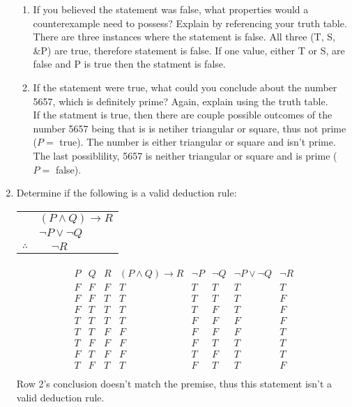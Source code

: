 \documentclass[11pt,a4paper]{article}
\newcommand\setItemNumber[1]{\setcounter{enumi}{\numexpr#1-1\relax}}
\begin{document}
\begin{enumerate}
\begin{enumerate}
                \item If you believed the statement was false, what properties would a counterexample need to possess? Explain by referencing your truth table.\\
                    There are three instances where the statement is false. All three (T, S, \&P) are true, therefore statement is false.  If one value, either T or S, are false and P is true then the statment is false. 
                \item If the statement were true, what could you conclude about the number 5657, which is definitely prime? Again, explain using the truth table.\\
                    If the statment is true, then there are couple possible outcomes of the number 5657 being that is is netiher triangular or square, thus not prime ($P =$ true). The number is either triangular or square and isn't prime. The last possiblility, 5657 is neither triangular or square and is prime ($P =$ false).
            \end{enumerate}

        \setItemNumber{14}
        \item Determine if the following is a valid deduction rule:
        \begin{center}
        \begin{tabular}{c@{\,}l@{}} 
                                & $(P\land Q)\rightarrow R$\\
                                & \;\;$\neg P\lor\neg Q$ \\\cline{1-2}
            $\therefore$        & $\;\;\;\;\neg R$ \\
          \end{tabular}
        \end{center}

                \begin{align*}
                    \begin{array}{|c|c|c|c|c|c|c|c|}
                        P & Q & R & (P\land Q)\rightarrow R & \neg P & \neg Q & \neg P \lor \neg Q & \neg R\\
                    \hline
                        F & F & F & T & T & T & T & T\\
                        F & F & T & T & T & T & T & F\\
                        F & T & T & T & T & F & T & F\\
                        T & T & T & T & F & F & F & F\\
                        T & T & F & F & F & F & F & T\\
                        T & F & F & F & F & T & T & T\\
                        F & T & F & F & T & F & T & T\\
                        T & F & T & T & F & T & T & F\\
                    \end{array}
                \end{align*}
                Row 2's conclusion doesn't match the premise, thus this statement isn't a valid deduction rule.


\end{enumerate}
\end{document}

